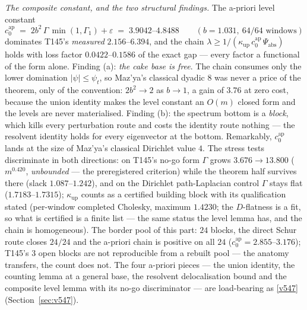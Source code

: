 \documentclass[11pt,a4paper]{article}
\begin{document}
\emph{The composite constant, and the two structural findings.} The a-priori level constant
\[
c_0^{\mathrm{ap}}\;=\;2b^2\,\Gamma\,\min(1,\Gamma_1)+\varepsilon\;=\;3.9042\text{--}4.8488
\qquad(b=1.031,\ 64/64\text{ windows})
\]
dominates T145's \emph{measured} $2.156$--$6.394$, and the chain
$\lambda\ge1/(\kappa_{\mathrm{up}}\,c_0^{\mathrm{ap}}\,\Psi_{\mathrm{abs}})$ holds with loss
factor $0.0422$--$0.1586$ of the exact gap --- every factor a functional of the form alone.
Finding (a): \emph{the cake base is free}. The chain consumes only the lower domination
$|\psi|\le\psi_t$, so Maz'ya's classical dyadic $8$ was never a price of the theorem, only of
the convention: $2b^2\to2$ as $b\to1$, a gain of $3.76$ at zero cost, because the union
identity makes the level constant an $O(m)$ closed form and the levels are never materialised.
Finding (b): the spectrum bottom is a \emph{block}, which kills every perturbation route and
costs the identity route nothing --- the resolvent identity holds for every eigenvector at the
bottom. Remarkably, $c_0^{\mathrm{ap}}$ lands at the size of Maz'ya's classical Dirichlet
value $4$. The stress tests discriminate in both directions: on T145's no-go form $\Gamma$
grows $3.676\to13.800$ ($m^{0.420}$, \emph{unbounded} --- the preregistered criterion) while
the theorem half survives there (slack $1.087$--$1.242$), and on the Dirichlet path-Laplacian
control $\Gamma$ stays flat ($1.7183$--$1.7315$); $\kappa_{\mathrm{up}}$ counts as a certified
building block with its qualification stated (per-window completed Cholesky, maximum $1.4230$;
the $D$-flatness is a fit, so what is certified is a finite list --- the same status the level
lemma has, and the chain is homogeneous). The border pool of this part: $24$ blocks, the
direct Schur route closes $24/24$ and the a-priori chain is positive on all $24$
($c_0^{\mathrm{ap}}=2.855$--$3.176$); T145's $3$ open blocks are not reproducible from a
rebuilt pool --- the anatomy transfers, the count does not. The four a-priori pieces --- the
union identity, the counting lemma at a general base, the resolvent delocalisation bound and
the composite level lemma with its no-go discriminator --- are load-bearing as \vref{v547}
 (Section~\ref{sec:v547}).
\end{document}
